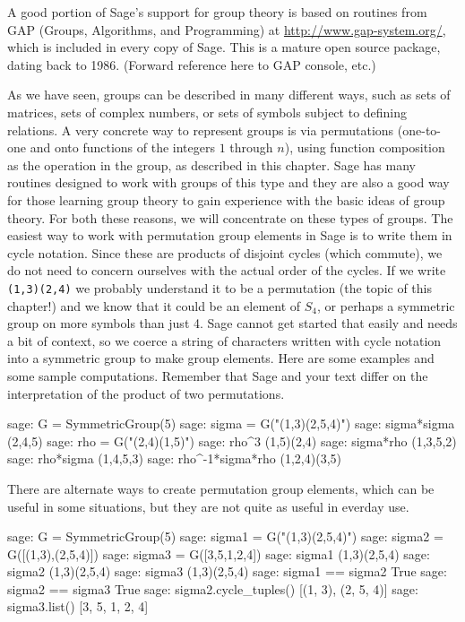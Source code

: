 A good portion of Sage's support for group theory is based on routines from GAP (Groups, Algorithms, and Programming) at \url{http://www.gap-system.org/}, which is included in every copy of Sage.  This is a mature open source package, dating back to 1986. (Forward reference here to GAP console, etc.)\par
%
As we have seen, groups can be described in many different ways, such as sets of matrices, sets of complex numbers, or sets of symbols subject to defining relations.  A very concrete
way to represent groups is via permutations (one-to-one and onto functions of the integers $1$ through $n$), using function composition as the operation in the group, as described in this chapter.  Sage has many routines designed to work with groups of this type and they are also a good way for those learning group theory to gain experience with the basic ideas of group theory.  For both these reasons, we will concentrate on these types of groups.
%
%
The easiest way to work with permutation group elements in Sage is to write them in cycle notation.  Since these are products of disjoint cycles (which commute), we do not need to concern ourselves with the actual order of the cycles.  If we write \verb?(1,3)(2,4)? we probably understand it to be a permutation (the topic of this chapter!) and we know that it could be an element of $S_4$, or perhaps a symmetric group on more symbols than just 4.  Sage cannot get started that easily and needs a bit of context, so we coerce a string of characters written with cycle notation into a symmetric group to make group elements.  Here are some examples and some sample computations.  Remember that Sage and your text differ on the interpretation of the product of two permutations.
%
\begin{sageexample}
sage: G = SymmetricGroup(5)
sage: sigma = G("(1,3)(2,5,4)")
sage: sigma*sigma
(2,4,5)
sage: rho = G("(2,4)(1,5)")
sage: rho^3
(1,5)(2,4)
sage: sigma*rho
(1,3,5,2)
sage: rho*sigma
(1,4,5,3)
sage: rho^-1*sigma*rho
(1,2,4)(3,5)
\end{sageexample}
%
There are alternate ways to create permutation group elements, which can be useful in some situations, but they are not quite as useful in everday use.
%
\begin{sageexample}
sage: G = SymmetricGroup(5)
sage: sigma1 = G("(1,3)(2,5,4)")
sage: sigma2 = G([(1,3),(2,5,4)])
sage: sigma3 = G([3,5,1,2,4])
sage: sigma1
(1,3)(2,5,4)
sage: sigma2
(1,3)(2,5,4)
sage: sigma3
(1,3)(2,5,4)
sage: sigma1 == sigma2
True
sage: sigma2 == sigma3
True
sage: sigma2.cycle_tuples()
[(1, 3), (2, 5, 4)]
sage: sigma3.list()
[3, 5, 1, 2, 4]
\end{sageexample}
